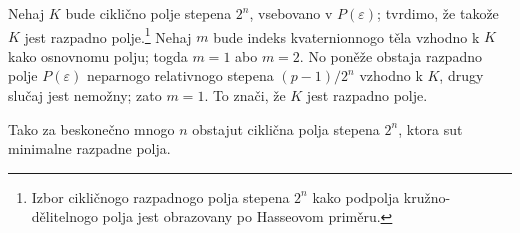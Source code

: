 \documentclass[11pt]{article}
\begin{document}
Nehaj $K$ bude ciklično polje stepena $2^n$, vsebovano v $P(\varepsilon)$; tvrdimo, že takože $K$ jest razpadno polje.\footnote{Izbor cikličnogo razpadnogo polja stepena $2^n$ kako podpolja kružno-dělitelnogo polja jest obrazovany po Hasseovom priměru.} Nehaj $m$ bude indeks kvaternionnogo těla vzhodno k $K$ kako osnovnomu polju; togda $m=1$ abo $m=2$. No poněže obstaja razpadno polje $P(\varepsilon)$ neparnogo relativnogo stepena $(p-1)/2^n$ vzhodno k $K$, drugy slučaj jest nemožny; zato $m=1$. To znači, že $K$ jest razpadno polje.

Tako za beskonečno mnogo $n$ obstajut ciklična polja stepena $2^n$, ktora sut minimalne razpadne polja.
\end{document}
